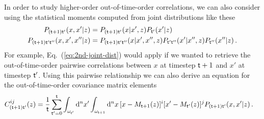 In order to study higher-order out-of-time-order correlations, we can also consider using the statistical moments computed from joint distributions like these
\begin{align}
P_{({\sf t}+1){\sf t}'}(x, x'\vert z) &= P_{({\sf t}+1){\sf t}'}(x\vert x',z)P_{{\sf t}'}(x'\vert z) \label{eq:2nd-joint-dist}\\
P_{({\sf t}+1){\sf t}'{\sf t}''}(x, x', x''\vert z) &= P_{({\sf t}+1){\sf t}'{\sf t}''}(x\vert x', x'', z)P_{{\sf t}'{\sf t}''}(x'\vert x'', z)P_{{\sf t}''}(x''\vert z) \label{eq:3rd-joint-dist}\,.
\end{align}
For example, Eq.~(\ref{eq:2nd-joint-dist}) would apply if we wanted to retrieve the out-of-time-order pairwise correlations between $x$ at timestep ${\sf t}+1$ and $x'$ at timestep ${\sf t}'$. Using this pairwise relationship we can also derive an equation for the out-of-time-order covariance matrix elements
\begin{align}
C_{({\sf t}+1){\sf t}'}^{ij}(z) &= \frac{1}{{\sf t}}\sum_{{\sf t}'=0}^{{\sf t}}\int_{\omega_{{\sf t}'}}{\rm d}^nx'\int_{\omega_{{\sf t}+1}}{\rm d}^nx \,[x-M_{{\sf t}+1}(z)]^i[x'-M_{{\sf t}'}(z)]^j P_{({\sf t}+1){\sf t}'}(x, x'\vert z) \label{eq:out-of-time-order-covariance-estimator} \,.
\end{align}


